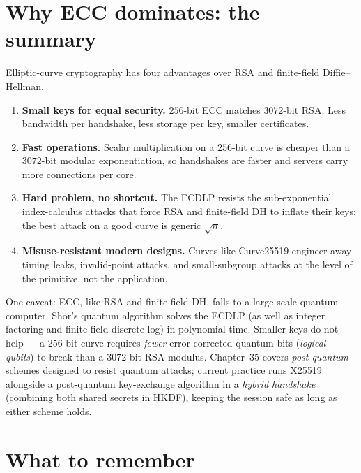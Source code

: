 \section{Why ECC dominates: the summary}
\label{ch21:dominance}

Elliptic-curve cryptography has four advantages over RSA and finite-field Diffie--Hellman.

\begin{enumerate}
  \item \textbf{Small keys for equal security.} $256$-bit ECC matches $3072$-bit RSA.
        Less bandwidth per handshake, less storage per key, smaller certificates.
  \item \textbf{Fast operations.} Scalar multiplication on a $256$-bit curve is cheaper
        than a $3072$-bit modular exponentiation, so handshakes are faster and servers
        carry more connections per core.
  \item \textbf{Hard problem, no shortcut.} The ECDLP resists the sub-exponential
        index-calculus attacks that force RSA and finite-field DH to inflate their keys;
        the best attack on a good curve is generic $\sqrt n$.
  \item \textbf{Misuse-resistant modern designs.} Curves like Curve25519 engineer away
        timing leaks, invalid-point attacks, and small-subgroup attacks at the level of
        the primitive, not the application.
\end{enumerate}

\begin{marginnotebox}
One caveat: ECC, like RSA and finite-field DH, falls to a large-scale quantum computer.
Shor's quantum algorithm solves the ECDLP (as well as integer factoring and finite-field
discrete log) in polynomial time. Smaller keys do not help --- a $256$-bit curve requires
\emph{fewer} error-corrected quantum bits (\emph{logical qubits}) to break than a
$3072$-bit RSA modulus. Chapter~35 covers \emph{post-quantum} schemes designed to resist
quantum attacks; current practice runs X25519 alongside a post-quantum key-exchange
algorithm in a \emph{hybrid handshake} (combining both shared secrets in HKDF), keeping
the session safe as long as either scheme holds.
\end{marginnotebox}

\section*{What to remember}

